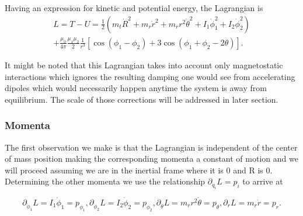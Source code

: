 \documentclass[prbg,preprint]{revtex4-1}
\begin{document}
Having an expression for kinetic and potential energy, the Lagrangian is 
\begin{equation}
  \begin{multlined}
    L=T-U=
    \frac{1}{2}(
        m_t \dot R^2
        +m_r \dot r^2
        +m_r r^2 \dot \theta^2
        + I_1 \dot \phi_1^2
        + I_2 \dot \phi_2^2
    )
    \\
    +
    \frac{\mu_0}{4\pi}
    \frac{\mu_1 \mu_2}{2}
    \frac{1}{r^3}
    [
        \cos(\phi_1-\phi_2)
        +3\cos(\phi_1+\phi_2 -2\theta)
    ].
  \end{multlined}
\end{equation}

It might be noted that this Lagrangian takes into account only magnetostatic interactions which ignores the resulting damping one would see from accelerating dipoles which would necessarily happen anytime the system is away from equilibrium. The scale of those corrections will be addressed in  later section.
\subsubsection{Momenta}

The first observation we make is that the Lagrangian is independent of the center of mass position making the corresponding momenta a constant of motion and we will proceed assuming we are in the inertial frame where it is 0 and R is 0. Determining the other momenta we use the relationship $\partial_{\dot q_i} L =p_i$ to arrive at

\begin{subequations}
    \begin{equation}
        \partial_{\dot \phi_1} L = I_1\dot \phi_1 = p_{\phi_1},
    \end{equation}
    \begin{equation}
        \partial_{\dot \phi_2} L =I_2\dot \phi_2 = p_{\phi_2},
    \end{equation}
    \begin{equation}
        \partial_{\dot \theta} L =m_r r^2 \dot \theta = p_{\theta},
    \end{equation}
    \begin{equation}
        \partial_{\dot r} L = m_r \dot r = p_r.
    \end{equation}
\end{subequations}
\end{document}

